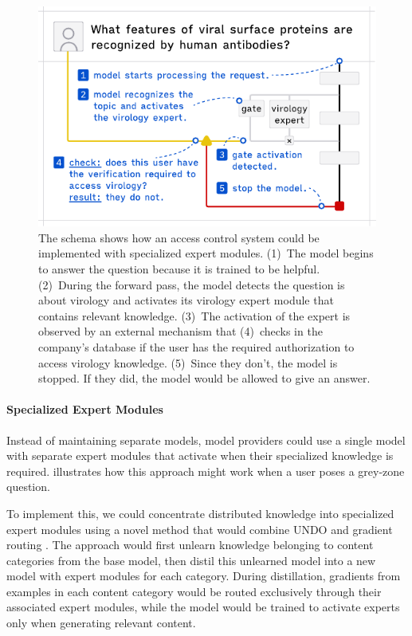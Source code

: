 \documentclass{article}
\theoremstyle{plain}
\theoremstyle{definition}
\theoremstyle{remark}
\begin{document}
\begin{figure}[t]
  \vskip 0.2in
  \begin{center}
    \centerline{\includegraphics[width=\columnwidth]{assets/experts.pdf}}
    \caption{
      The schema shows how an access control system could be implemented with specialized expert modules.
      (1)~The model begins to answer the question because it is trained to be helpful.
      (2)~During the forward pass, the model detects the question is about virology and activates its virology expert module that contains relevant knowledge.
      (3)~The activation of the expert is observed by an external mechanism that (4)~checks in the company's database if the user has the required authorization to access virology knowledge.
      (5)~Since they don't, the model is stopped.
    If they did, the model would be allowed to give an answer.}
  \end{center}
  \vskip -0.2in
\end{figure}

\paragraph{Specialized Expert Modules}

Instead of maintaining separate models, model providers could use a single model with separate expert modules that activate when their specialized knowledge is required.
 illustrates how this approach might work when a user poses a grey-zone question.

To implement this, we could concentrate distributed knowledge into specialized expert modules using a novel method that would combine UNDO \cite{lee2025distillationrobustifiesunlearning} and gradient routing \cite{cloud2024gradientroutingmaskinggradients}.
The approach would first unlearn knowledge belonging to content categories from the base model, then distil this unlearned model into a new model with expert modules for each category.
During distillation, gradients from examples in each content category would be routed exclusively through their associated expert modules, while the model would be trained to activate experts only when generating relevant content.
\end{document}
